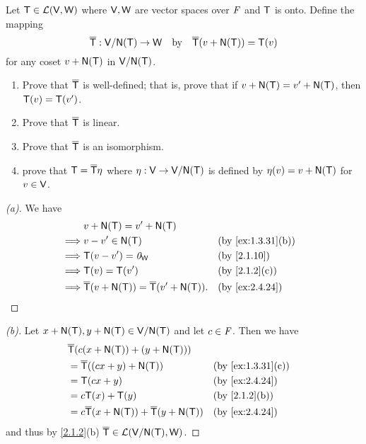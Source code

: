 \begin{ex}\label{ex:2.4.24}
  Let \(\mathsf{T} \in \mathcal{L}(\mathsf{V}, \mathsf{W})\) where \(\mathsf{V}, \mathsf{W}\) are vector spaces over \(\mathit{F}\) and \(\mathsf{T}\) is onto.
  Define the mapping
  \[
    \overline{\T} : \V / \ns{\T} \to \W \quad \text{by} \quad \overline{\T}(v + \ns{\T}) = \T(v)
  \]
  for any coset \(v + \ns{\T}\) in \(\V / \ns{\T}\).
  \begin{enumerate}
    \item Prove that \(\overline{\mathsf{T}}\) is well-defined;
          that is, prove that if \(v + \ns{\T} = v' + \ns{\T}\), then \(\mathsf{T}(v) = \mathsf{T}(v')\).
    \item Prove that \(\overline{\mathsf{T}}\) is linear.
    \item Prove that \(\overline{\mathsf{T}}\) is an isomorphism.
    \item prove that \(\mathsf{T} = \overline{\mathsf{T}} \eta\) where \(\eta : \V \to \V / \ns{\T}\) is defined by \(\eta(v) = v + \ns{\T}\) for \(v \in \mathsf{V}\).
  \end{enumerate}
\end{ex}

\begin{proof}[(a)]
  We have
  \begin{align*}
             & v + \ns{\T} = v' + \ns{\T}                                                                     \\
    \implies & v - v' \in \ns{\T}                                        &  & \text{(by \cref{ex:1.3.31}(b))} \\
    \implies & \T(v - v') = \zv_{\W}                                     &  & \text{(by \cref{2.1.10})}       \\
    \implies & \T(v) = \T(v')                                            &  & \text{(by \cref{2.1.2}(c))}     \\
    \implies & \overline{\T}(v + \ns{\T}) = \overline{\T}(v' + \ns{\T}). &  & \text{(by \cref{ex:2.4.24})}
  \end{align*}
\end{proof}

\begin{proof}[(b)]
  Let \(x + \ns{\T}, y + \ns{\T} \in \V / \ns{\T}\) and let \(c \in \mathit{F}\).
  Then we have
  \begin{align*}
     & \overline{\T}(c (x + \ns{\T}) + (y + \ns{\T}))                                                   \\
     & = \overline{\T}((cx + y) + \ns{\T})                         &  & \text{(by \cref{ex:1.3.31}(c))} \\
     & = \T(cx + y)                                                &  & \text{(by \cref{ex:2.4.24})}    \\
     & = c \T(x) + \T(y)                                           &  & \text{(by \cref{2.1.2}(b))}     \\
     & = c \overline{\T}(x + \ns{\T}) + \overline{\T}(y + \ns{\T}) &  & \text{(by \cref{ex:2.4.24})}
  \end{align*}
  and thus by \cref{2.1.2}(b) \(\overline{\T} \in \ls(\V / \ns{\T}, \W)\).
\end{proof}

